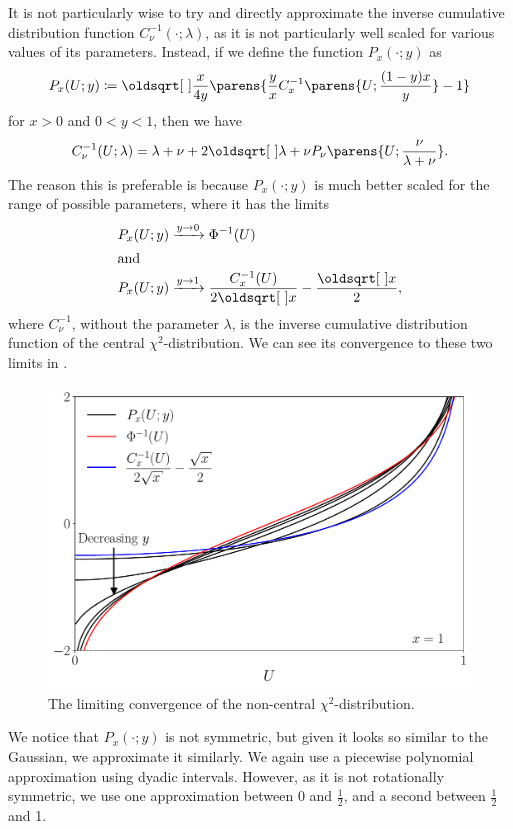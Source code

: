 \documentclass[11pt,a4paper,twoside,english]{extarticle}
\begin{document}
It is not particularly wise to try and directly approximate the inverse cumulative distribution function $ C^{-1}_{\nu}(\cdot;\lambda) $, as it is not particularly well scaled for various values of its parameters. Instead, if we define the function $ P_x(\cdot;y) $ as 
\begin{equation}
P_x(U;y) \coloneqq \sqrt{\dfrac{x}{4y}}\parens{ \dfrac{y}{x}  C^{-1}_{x}\parens{U; \dfrac{(1 - y)x}{y}} - 1}
\end{equation}
for $ x > 0 $ and $ 0 < y < 1  $, then we have 
\begin{equation}
C^{-1}_{\nu}(U;\lambda) = \lambda + \nu + 2 \sqrt{\lambda + \nu} P_\nu\parens{U;\dfrac{\nu}{\lambda + \nu}}.
\end{equation}
The reason this is preferable is because $ P_x(\cdot;y) $ is much better scaled for the range of possible parameters, where it has the limits
\begin{align}
P_x(U;y) & \xrightarrow{y\to 0} \Phi^{-1}(U) \\
\shortintertext{and}
P_x(U;y) & \xrightarrow{y\to 1} \dfrac{C^{-1}_x(U)}{2\sqrt{x}} - \dfrac{\sqrt{x}}{2},
\end{align}
where $ C^{-1}_\nu $, without the parameter $ \lambda $, is the inverse cumulative distribution function of the central $ \chi^2 $-distribution. We can see its convergence to these two limits in .

\begin{figure}[h!tb]
\centering
\includegraphics[width=0.7\linewidth]{cir_update_factor_convergence_to_gaussian_both_limits}
\caption{The limiting convergence of the non-central $ \chi^2 $-distribution.}
\label{fig:cir_update_factor_convergence_to_gaussian_both_limits}
\end{figure}

We notice that $ P_x(\cdot;y) $ is not symmetric, but given it looks so similar to the Gaussian, we approximate it similarly. We again use a piecewise polynomial approximation using dyadic intervals. However, as it is not rotationally symmetric, we use one approximation between 0 and $ \tfrac{1}{2} $, and a second between $ \tfrac{1}{2} $ and 1. 
\end{document}
